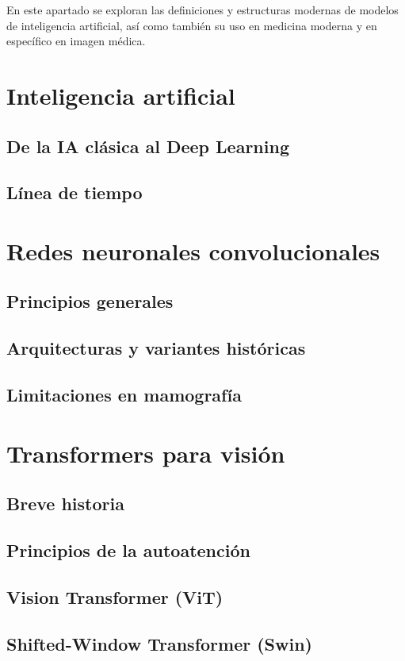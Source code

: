 \documentclass[a4paper,10pt]{book}
\begin{document}
En este apartado se exploran las definiciones y estructuras modernas de modelos de inteligencia artificial, así como también su uso en medicina moderna y en específico en imagen médica.


\section{Inteligencia artificial}
\subsection{De la IA clásica al Deep Learning}
\subsection{Línea de tiempo}

\section{Redes neuronales convolucionales}
\subsection{Principios generales}
\subsection{Arquitecturas y variantes históricas}
\subsection{Limitaciones en mamografía}


\section{Transformers para visión}
\subsection{Breve historia}
\subsection{Principios de la autoatención}
\subsection{Vision Transformer (ViT)}
\subsection{Shifted-Window Transformer (Swin)}
\end{document}
